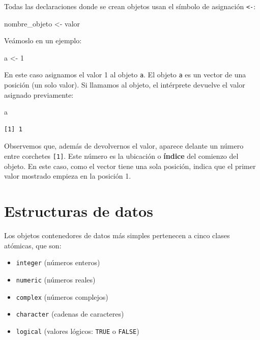 \documentclass[
  spanish,
  a4paper,
]{scrbook}
\newenvironment{Shaded}{\begin{snugshade}}{\end{snugshade}}
\newcommand{\DecValTok}[1]{\textcolor[rgb]{0.68,0.00,0.00}{#1}}
\newcommand{\NormalTok}[1]{\textcolor[rgb]{0.00,0.23,0.31}{#1}}
\newcommand{\OtherTok}[1]{\textcolor[rgb]{0.00,0.23,0.31}{#1}}
\begin{document}
Todas las declaraciones donde se crean objetos usan el símbolo de
asignación \texttt{\textless{}-}:

\begin{Shaded}
\begin{Highlighting}[]
\NormalTok{nombre\_objeto }\OtherTok{\textless{}{-}}\NormalTok{ valor}
\end{Highlighting}
\end{Shaded}

Veámoslo en un ejemplo:

\begin{Shaded}
\begin{Highlighting}[]
\NormalTok{a }\OtherTok{\textless{}{-}} \DecValTok{1}
\end{Highlighting}
\end{Shaded}

En este caso asignamos el valor 1 al objeto \texttt{a}. El objeto
\texttt{a} es un vector de una posición (un solo valor). Si llamamos al
objeto, el intérprete devuelve el valor asignado previamente:

\begin{Shaded}
\begin{Highlighting}[]
\NormalTok{a}
\end{Highlighting}
\end{Shaded}

\begin{verbatim}
[1] 1
\end{verbatim}

Observemos que, además de devolvernos el valor, aparece delante un
número entre corchetes \texttt{{[}1{]}}. Este número es la ubicación o
\textbf{índice} del comienzo del objeto. En este caso, como el vector
tiene una sola posición, indica que el primer valor mostrado empieza en
la posición 1.

\section{Estructuras de datos}\label{estructuras-de-datos}

Los objetos contenedores de datos más simples pertenecen a cinco clases
atómicas, que son:

\begin{itemize}
\item
  \texttt{integer} (números enteros)
\item
  \texttt{numeric} (números reales)
\item
  \texttt{complex} (números complejos)
\item
  \texttt{character} (cadenas de caracteres)
\item
  \texttt{logical} (valores lógicos: \texttt{TRUE} o \texttt{FALSE})
\end{itemize}
\end{document}
